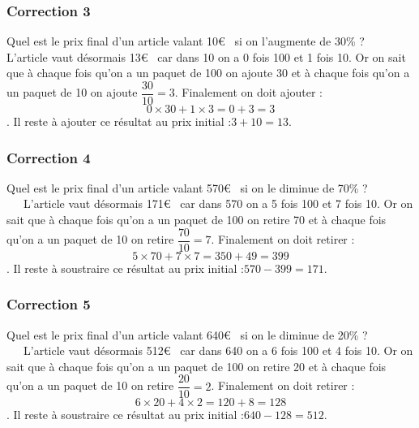 \documentclass[15pt, mathserif]{beamer}
\begin{document}
\begin{frame}
\vspace{-10mm}
	\frametitle{Correction 3}
Quel est le prix final d'un article valant 10\euro ~ si on l'augmente de 30\% ? \\ L'article vaut désormais 13\euro ~ car dans 10 on a 0 fois 100 et 1 fois 10. Or on sait que à chaque fois qu'on a un paquet de 100 on ajoute 30 et à chaque fois qu'on a un paquet de 10 on ajoute $\dfrac{30}{10}=3$. Finalement on doit ajouter : $$0\times 30 + 1\times3 = 0+3=3$$. Il reste à ajouter ce résultat au prix initial :$3+10=13$.\end{frame}


\begin{frame}
\vspace{-10mm}
	\frametitle{Correction 4}
Quel est le prix final d'un article valant 570\euro ~ si on le diminue de 70\% ? \\ ~~\ L'article vaut désormais 171\euro ~ car dans 570 on a 5 fois 100 et 7 fois 10. Or on sait que à chaque fois qu'on a un paquet de 100 on retire 70 et à chaque fois qu'on a un paquet de 10 on retire $\dfrac{70}{10}=7$. Finalement on doit retirer : $$5\times 70 + 7\times7 = 350+49=399$$. Il reste à soustraire ce résultat au prix initial :$570-399=171$.\end{frame}


\begin{frame}
\vspace{-10mm}
	\frametitle{Correction 5}
Quel est le prix final d'un article valant 640\euro ~ si on le diminue de 20\% ? \\ ~~\ L'article vaut désormais 512\euro ~ car dans 640 on a 6 fois 100 et 4 fois 10. Or on sait que à chaque fois qu'on a un paquet de 100 on retire 20 et à chaque fois qu'on a un paquet de 10 on retire $\dfrac{20}{10}=2$. Finalement on doit retirer : $$6\times 20 + 4\times2 = 120+8=128$$. Il reste à soustraire ce résultat au prix initial :$640-128=512$.\end{frame}
\end{document}
